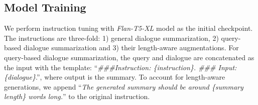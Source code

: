 \documentclass[11pt]{article}
\begin{document}
    \subsection{Model Training}
    \label{sec:model_training}

        We perform instruction tuning with \emph{Flan-T5-XL} model as the initial checkpoint. The instructions are three-fold: 1) general dialogue summarization, 2) query-based dialogue summarization and 3) their length-aware augmentations. For query-based dialogue summarization, the query and dialogue are concatenated as the input with the template: ``\emph{\#\#\#Instruction: \{instruction\}. \#\#\# Input: \{dialogue\}}.'', where output is the summary. To account for length-aware generations, we append ``\emph{The generated summary should be around \{summary length\} words long.}'' to the original instruction.
\end{document}
